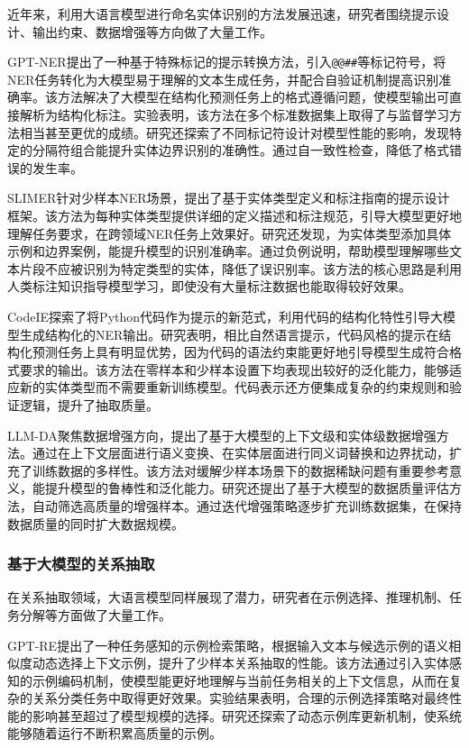 近年来，利用大语言模型进行命名实体识别的方法发展迅速，研究者围绕提示设计、输出约束、数据增强等方向做了大量工作。

GPT-NER\cite{gpt_ner_2023}提出了一种基于特殊标记的提示转换方法，引入\texttt{@@\#\#}等标记符号，将NER任务转化为大模型易于理解的文本生成任务，并配合自验证机制提高识别准确率。该方法解决了大模型在结构化预测任务上的格式遵循问题，使模型输出可直接解析为结构化标注。实验表明，该方法在多个标准数据集上取得了与监督学习方法相当甚至更优的成绩。研究还探索了不同标记符设计对模型性能的影响，发现特定的分隔符组合能提升实体边界识别的准确性。通过自一致性检查，降低了格式错误的发生率。

SLIMER\cite{slimer_2024}针对少样本NER场景，提出了基于实体类型定义和标注指南的提示设计框架。该方法为每种实体类型提供详细的定义描述和标注规范，引导大模型更好地理解任务要求，在跨领域NER任务上效果好。研究还发现，为实体类型添加具体示例和边界案例，能提升模型的识别准确率。通过负例说明，帮助模型理解哪些文本片段不应被识别为特定类型的实体，降低了误识别率。该方法的核心思路是利用人类标注知识指导模型学习，即使没有大量标注数据也能取得较好效果。

CodeIE\cite{codeie_2023}探索了将Python代码作为提示的新范式，利用代码的结构化特性引导大模型生成结构化的NER输出。研究表明，相比自然语言提示，代码风格的提示在结构化预测任务上具有明显优势，因为代码的语法约束能更好地引导模型生成符合格式要求的输出。该方法在零样本和少样本设置下均表现出较好的泛化能力，能够适应新的实体类型而不需要重新训练模型。代码表示还方便集成复杂的约束规则和验证逻辑，提升了抽取质量。

LLM-DA\cite{llm_da_2024}聚焦数据增强方向，提出了基于大模型的上下文级和实体级数据增强方法。通过在上下文层面进行语义变换、在实体层面进行同义词替换和边界扰动，扩充了训练数据的多样性。该方法对缓解少样本场景下的数据稀缺问题有重要参考意义，能提升模型的鲁棒性和泛化能力。研究还提出了基于大模型的数据质量评估方法，自动筛选高质量的增强样本。通过迭代增强策略逐步扩充训练数据集，在保持数据质量的同时扩大数据规模。

\subsubsection{基于大模型的关系抽取}

在关系抽取领域，大语言模型同样展现了潜力，研究者在示例选择、推理机制、任务分解等方面做了大量工作。

GPT-RE\cite{gpt_re_2023}提出了一种任务感知的示例检索策略，根据输入文本与候选示例的语义相似度动态选择上下文示例，提升了少样本关系抽取的性能。该方法通过引入实体感知的示例编码机制，使模型能更好地理解与当前任务相关的上下文信息，从而在复杂的关系分类任务中取得更好效果。实验结果表明，合理的示例选择策略对最终性能的影响甚至超过了模型规模的选择。研究还探索了动态示例库更新机制，使系统能够随着运行不断积累高质量的示例。

